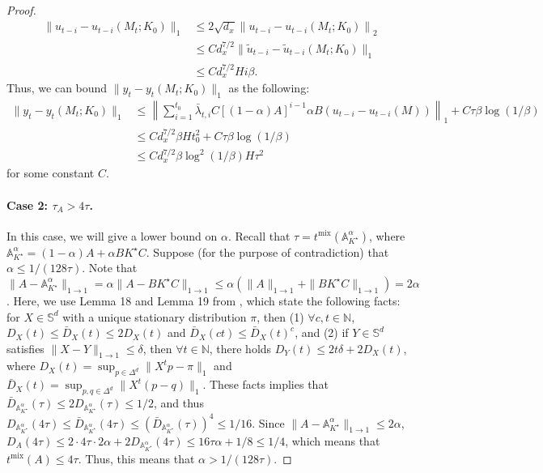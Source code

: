 \begin{proof}
\begin{align*}
\|u_{t-i}-u_{t-i}(M_t;K_0)\|_1&\le 2\sqrt{d_x}\left\|u_{t-i}-u_{t-i}(M_t;K_0)\right\|_2\\
&\le C d_x^{7/2}\|\tilde{u}_{t-i}-\tilde{u}_{t-i}(M_t;K_0)\|_1\\
&\le Cd_x^{7/2}Hi\beta.
\end{align*}
Thus, we can bound $\|y_t-y_t(M_t;K_0)\|_1$ as the following: 
\begin{align*}
\|y_t-y_t(M_t;K_0)\|_1&\le \left\|\sum_{i=1}^{t_0}\bar{\lambda}_{t,i}C[(1-\alpha)A]^{i-1}\alpha B(u_{t-i}-u_{t-i}(M))\right\|_1+C\tau\beta\log(1/\beta)\\
&\le Cd_x^{7/2}\beta H t_0^2 +C\tau\beta\log(1/\beta)\\
&\le Cd_x^{7/2}\beta \log^2(1/\beta) H\tau^2
\end{align*}
for some constant $C$.


\paragraph{Case 2: $\tau_A>4\tau$.} In this case, we will give a lower bound on $\alpha$. Recall that $\tau=t^{\mathrm{mix}}(\mathbb{A}_{K^{\star}}^{\alpha})$, where  $\mathbb{A}_{K^{\star}}^{\alpha}=(1-\alpha)A+\alpha BK^{\star}C$. Suppose (for the purpose of contradiction) that $\alpha\le 1/(128\tau)$. Note that $\|A-\mathbb{A}_{K^{\star}}^{\alpha}\|_{1\rightarrow 1}=\alpha\| A -  BK^{\star}C\|_{1\rightarrow 1}\le \alpha(\|A\|_{1\rightarrow 1}+\|BK^{\star}C\|_{1\rightarrow 1})=2\alpha$. Here, we use Lemma 18 and Lemma 19 from \citep{golowich2024online}, which state the following facts: for $X\in\mathbb{S}^d$ with a unique stationary distribution $\pi$, then (1) $\forall c, t\in\mathbb{N}$, $D_X(t)\le \bar{D}_X(t)\le 2D_X(t)$ and $\bar{D}_X(ct)\le \bar{D}_X(t)^c$, and (2) if $Y\in\mathbb{S}^d$ satisfies $\|X-Y\|_{1\rightarrow 1}\le \delta$, then $\forall t\in\mathbb{N}$, there holds $D_Y(t)\le 2t\delta+2D_X(t)$, where $D_X(t)=\sup_{p\in\Delta^d}\|X^t p-\pi\|_1$ and $\bar{D}_X(t)=\sup_{p,q\in\Delta^d}\|X^t(p-q)\|_1$. These facts implies that $\bar{D}_{\mathbb{A}_{K^{\star}}^{\alpha}}(\tau)\le 2D_{\mathbb{A}_{K^{\star}}^{\alpha}}(\tau)\le 1/2$, and thus $D_{\mathbb{A}_{K^{\star}}^{\alpha}}(4\tau)\le \bar{D}_{\mathbb{A}_{K^{\star}}^{\alpha}}(4\tau)\le (\bar{D}_{\mathbb{A}_{K^{\star}}^{\alpha}}(\tau))^4\le 1/16$. Since $\|A-\mathbb{A}_{K^{\star}}^{\alpha}\|_{1\rightarrow 1}\le 2\alpha$, $D_A(4\tau)\le 2\cdot 4\tau\cdot 2\alpha+2D_{\mathbb{A}_{K^{\star}}^{\alpha}}(4\tau)\le 16\tau\alpha+1/8\le 1/4$, which means that $t^{\mathrm{mix}}(A)\le 4\tau$. Thus, this means that $\alpha > 1/(128\tau)$.


\end{proof}
